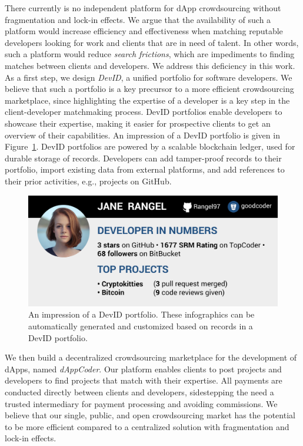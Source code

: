 There currently is no independent platform for dApp crowdsourcing without fragmentation and lock-in effects.
We argue that the availability of such a platform would increase efficiency and effectiveness when matching reputable developers looking for work and clients that are in need of talent.
In other words, such a platform would reduce \emph{search frictions}, which are impediments to finding matches between clients and developers.
We address this deficiency in this work.
As a first step, we design \emph{DevID}, a unified portfolio for software developers.
We believe that such a portfolio is a key precursor to a more efficient crowdsourcing marketplace, since highlighting the expertise of a developer is a key step in the client-developer matchmaking process.
DevID portfolios enable developers to showcase their expertise, making it easier for prospective clients to get an overview of their capabilities.
An impression of a DevID portfolio is given in Figure~\ref{fig:devid}.
DevID portfolios are powered by a scalable blockchain ledger, used for durable storage of records.
Developers can add tamper-proof records to their portfolio, import existing data from external platforms, and add references to their prior activities, e.g., projects on GitHub.

\begin{figure}[t]
	\includegraphics[width=\columnwidth]{devid/resources/devid_smaller.jpeg}
	\caption{An impression of a DevID portfolio. These infographics can be automatically generated and customized based on records in a DevID portfolio.}
	\label{fig:devid}
\end{figure}

We then build a decentralized crowdsourcing marketplace for the development of dApps, named \emph{dAppCoder}.
Our platform enables clients to post projects and developers to find projects that match with their expertise.
All payments are conducted directly between clients and developers, sidestepping the need a trusted intermediary for payment processing and avoiding commissions.
We believe that our single, public, and open crowdsourcing market has the potential to be more efficient compared to a centralized solution with fragmentation and lock-in effects.


